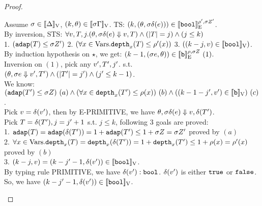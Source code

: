 \documentclass[a4paper,11pt]{article}
\theoremstyle{definition}
\begin{document}
\begin{proof}
\begin{mainitem}
Assume $ \sigma \in [\![ \Delta ]\!]_{\text{V}}$, $(k, \theta) \in [\![ \sigma \Gamma ]\!]_{\text{V}}$. TS: $(k, (\theta, \sigma \delta(e))) \in [\![ \mathtt{bool} ]\!]_{\text{E}}^{\rho', \sigma Z'}$.\\
%
By inversion, STS: $\forall v, T, j. (\theta, \sigma \delta(e) \mathrel{\Downarrow} v, T) \land (|T| = j) \land (j \leq k)$\\
%
1. $(\mathtt{adap}(T) \leq \sigma Z')$
%
2. $(\forall x \in \mbox{Vars}. \mathtt{depth}_{x}(T) \leq \rho'(x))$
%
3. $((k - j, v) \in [\![ \mathtt{bool} ]\!]_{\text{V}})$.\\
%
By induction hypothesis on $\star$, we get: $(k-1, (\sigma e, \theta)) \in [\![ \mathtt{b} ]\!]_{\text{E}}^{\rho, \sigma Z} ~ (1)$.\\
%
Inversion on $(1)$, pick any $ v', T', j'$. s.t. $ (\theta, \sigma e \mathrel{\Downarrow} v', T') \land (|T'| = j') \land (j' \leq k-1)$.\\
%
We know: $(\mathtt{adap}(T') \leq \sigma Z) ~ (a)
\land (\forall x \in \mathtt{depth}_{x}(T') \leq \rho(x)) ~ (b)
\land ((k -1- j', v') \in [\![ \mathtt{b} ]\!]_{\text{V}}) ~ (c)$.\\
%
Pick $v = \delta(v')$, then by E-PRIMITIVE, we have $\theta, \sigma \delta(e) \mathrel{\Downarrow} v, \delta(T')$.\\
%
Pick $T = \delta(T'), j = j' + 1$ s.t.  $j \leq k$, following 3 goals are proved:\\
%
1. $\mathtt{adap}(T) = \mathtt{adap}(\delta(T')) = 1 + \mathtt{adap}(T') \leq 1 + \sigma Z = \sigma Z'$ proved by $(a)$\\
%
2. $\forall x \in \mbox{Vars}. \mathtt{depth}_{x}(T) = \mathtt{depth}_{x}(\delta(T')) = 1 + \mathtt{depth}_{x}(T') \leq 1 + \rho(x) = \rho'(x)$ proved by $(b)$\\
%
3. $(k - j, v) = (k - j' - 1, \delta(v')) \in [\![ \mathtt{bool} ]\!]_{\text{V}} $.\\
%
By typing rule PRIMITIVE, we have $\delta(v'): \mathtt{bool}$. $\delta(v')$ is either $\mathtt{true}$ or $\mathtt{false}$. So, we have $(k - j' - 1, \delta(v')) \in [\![ \mathtt{bool} ]\!]_{\text{V}}$.\\
%




\end{mainitem}
\end{proof}
\end{document}
